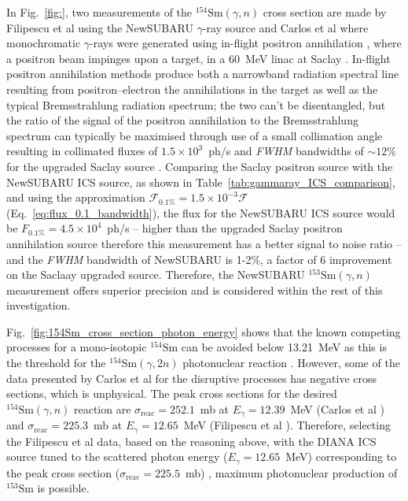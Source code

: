 \documentclass[../main.tex]{subfiles}
\begin{document}
In Fig.~\ref{fig:}, two measurements of the $^{154}\mathrm{Sm}\left(\gamma,n\right)$ cross section are made by Filipescu et al \cite{filipescu2014photoneutron} using the NewSUBARU $\gamma$-ray source \cite{utsunomiya2015gamma} and Carlos et al \cite{carlos1974giant} where monochromatic $\gamma$-rays were generated using in-flight positron annihilation \cite{miller1960monochromatic}, where a positron beam impinges upon a target, in a 60~\si{\mega\electronvolt} linac at Saclay \cite{audit1970etude}. In-flight positron annihilation methods produce both a narrowband radiation spectral line resulting from positron--electron the annihilations in the target as well as the typical Bremsstrahlung radiation spectrum; the two can't be disentangled, but the ratio of the signal of the positron annihilation to the Bremsstrahlung spectrum can typically be maximised through use of a small collimation angle resulting in collimated fluxes of $1.5\times10^{3}$~ph/\si{\second} and \textit{FWHM} bandwidths of $\sim 12$\% for the upgraded Saclay source \cite{veyssiere1979quasi}. Comparing the Saclay positron source with the NewSUBARU ICS source, as shown in Table~\ref{tab:gammaray_ICS_comparison}, and using the approximation $\mathcal{F}_{\mathrm{0.1\%}} = 1.5\times 10^{-3}\mathcal{F}$ \cite{krafft2010compton} (Eq.~\ref{eq:flux_0.1_bandwidth}), the flux for the NewSUBARU ICS source would be $F_{0.1\%}=4.5\times 10^{4}$~ph/\si{\second} -- higher than the upgraded Saclay positron annihilation source \cite{veyssiere1979quasi} therefore this measurement has a better signal to noise ratio -- and the \textit{FWHM} bandwidth of NewSUBARU is 1-2\%, a factor of 6 improvement on the Saclaay upgraded source. Therefore, the NewSUBARU $^{153}\mathrm{Sm}\left(\gamma,n\right)$ measurement offers superior precision and is considered within the rest of this investigation.  

Fig.~\ref{fig:154Sm_cross_section_photon_energy} shows that the known competing processes for a mono-isotopic $^{154}\mathrm{Sm}$ can be avoided below 13.21~\si{\mega\electronvolt} as this is the threshold for the $^{154}\mathrm{Sm}\left(\gamma,2n\right)$ photonuclear reaction \cite{carlos1974giant}. However, some of the data presented by Carlos et al \cite{carlos1974giant} for the disruptive processes has negative cross sections, which is unphysical. The peak cross sections for the desired $^{154}\mathrm{Sm}\left(\gamma,n\right)$ reaction are $\sigma_{\mathrm{reac}} = 252.1$~\si{\milli\barn} at $E_{\gamma} = 12.39$~\si{\mega\electronvolt} (Carlos et al \cite{carlos1974giant}) and $\sigma_{\mathrm{reac}} = 225.3$~\si{\milli\barn} at $E_{\gamma} = 12.65$~\si{\mega\electronvolt} (Filipescu et al \cite{filipescu2014photoneutron}). Therefore, selecting the Filipescu et al \cite{filipescu2014photoneutron} data, based on the reasoning above, with the DIANA ICS source tuned to the scattered photon energy ($E_{\gamma}=12.65$~\si{\mega\electronvolt}) corresponding to the peak cross section ($\sigma_{\mathrm{reac}}=225.5$~\si{\milli\barn}) , maximum photonuclear production of $^{153}\mathrm{Sm}$ is possible.
\end{document}
